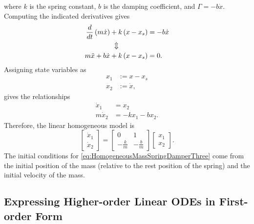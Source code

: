 where $k$ is the spring constant, $b$ is the damping coefficient, and $\Gamma =  -b \dot{x}$. Computing the indicated derivatives gives
\begin{equation}
\begin{aligned}
    \frac{d}{dt}\left(m  \dot{x} \right) + k\left( x-x_s\right) &= -b \dot{x} \\
 \Updownarrow \hspace{1.5cm}   &  \\
     m \ddot{x} + b \dot{x} + k\left( x-x_s\right) &= 0.
\end{aligned}     
\end{equation}
Assigning state variables as
\begin{equation}
\label{eq:StatesMassSpringDamper}
    \begin{aligned}
        x_1 &:= x - x_s \\
        x_2 & := \dot{x},
    \end{aligned}
\end{equation}
gives the relationships
\begin{equation}
\label{eq:HomogeneousMassSpringDamperTwo}
\begin{aligned}
   \dot{x}_1 &= x_2\\
   m \dot{x}_2 &= -k x_1 - b x_2. 
\end{aligned}
\end{equation}
Therefore, the linear homogeneous model is
\begin{equation}
\label{eq:HomogeneousMassSpringDamperThree}
\left[ \begin{array}{c} \dot{x}_1  \\ \dot{x}_2 \end{array} \right] = \left[ \begin{array}{cc} 0 & 1\\- \frac{k}{m} & -\frac{b}{m} \end{array}\right] \left[ \begin{array}{c} x_1  \\ x_2 \end{array}\right].
\end{equation}
The initial conditions for \eqref{eq:HomogeneousMassSpringDamperThree} come from the initial position of the mass (relative to the rest position of the spring) and the initial velocity of the mass.

\Qed

\subsection{Expressing Higher-order Linear ODEs in First-order Form}

